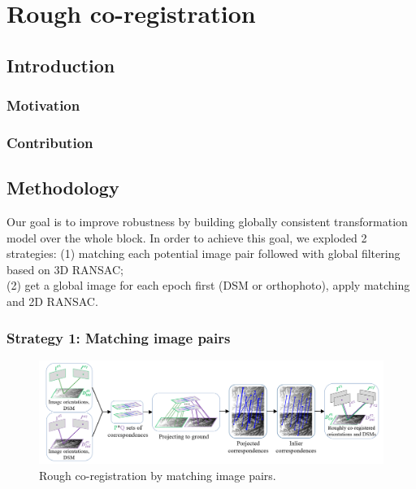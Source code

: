 
\chapter{Rough co-registration}
\label{chap:intro}
\minitoc

\section{Introduction}
\subsection{Motivation}


\subsection{Contribution}

\section{Methodology}
Our goal is to improve robustness by building globally consistent transformation model over the whole block.
In order to achieve this goal, we exploded 2 strategies:
(1) matching each potential image pair followed with global filtering based on 3D RANSAC;\\
(2) get a global image for each epoch first (DSM or orthophoto), apply matching and 2D RANSAC.\\

\subsection{Strategy 1: Matching image pairs}
\begin{figure}[htbp]
	\begin{center}
		\includegraphics[width=1\columnwidth]{images/Chapitre3/R3D.png}
		\caption{Rough co-registration by matching image pairs.}
		\label{Flow-process diagram}
	\end{center}
\end{figure}

